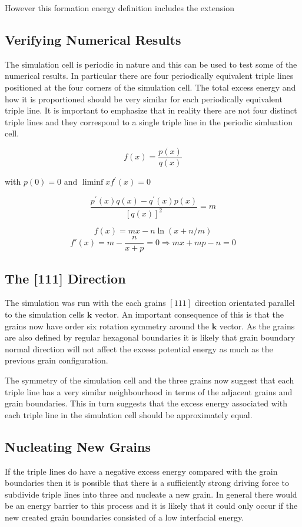 \documentclass[12pt,a4paper]{book}
\begin{document}
However this formation energy definition includes the extension  

\subsection{Verifying Numerical Results}

The simulation cell is periodic in nature and this can be used to test some of the numerical results. In particular there are four periodically equivalent triple lines positioned at the four corners of the simulation cell. The total excess energy and how it is proportioned should be very similar for each periodically equivalent triple line. It is important to emphasize that in reality there are not four distinct triple lines and they correspond to a single triple line in the periodic simluation cell.


\[ f(x) = \frac{p(x)}{q(x)} \]

with $p(0)=0$ and $\liminf{x}{f^{\prime}(x)}=0$

\[ \frac{p^{\prime}(x)q(x) -q^{\prime}(x)p(x)}{[q(x)]^2} = m\]


\[ f(x) = mx - n\ln(x+n/m)\]
\[ f'(x) = m -\frac{n}{x+p} = 0 \Rightarrow  mx + mp - n = 0 \]


\subsection{The [111] Direction}
The simulation was run with the each grains $[111]$ direction orientated parallel to the simulation cells $\mathbf{k}$ vector. An important consequence of this is that the grains now have order six rotation symmetry around the $\mathbf{k}$ vector. As the grains are also defined by regular hexagonal boundaries it is likely that grain boundary normal direction will not affect the excess potential energy as much as the previous grain configuration.

The symmetry of the simulation cell and the three grains now suggest that each triple line has a very similar neighbourhood in terms of the adjacent grains and grain boundaries. This in turn suggests that the excess energy associated with each triple line in the simulation cell should be approximately equal.

\subsection{Nucleating New Grains}

If the triple lines do have a negative excess energy compared with the grain boundaries then it is possible that there is a sufficiently strong driving force to subdivide triple lines into three and nucleate a new grain. In general there would be an energy barrier to this process and it is likely that it could only occur if the new created grain boundaries consisted of a low interfacial energy.
\end{document}
